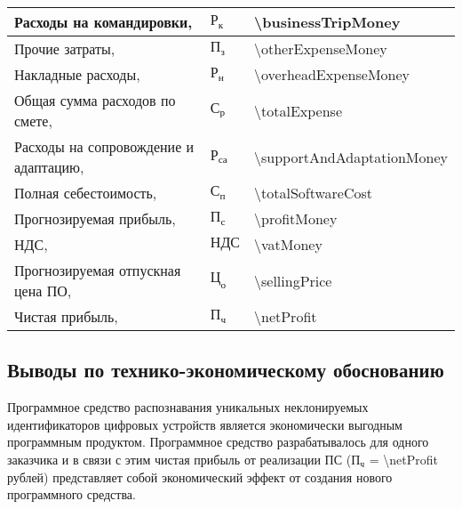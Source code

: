 \begin{longtable}{| >{\raggedright}m{}
                  | >{\centering}m{}
                  | >{\centering\arraybackslash}m{}|}
    Расходы на командировки, \byr{}
    & $ \text{Р}_\text{к} $
    & \num{\businessTripMoney}
    \\ \hline

    Прочие затраты, \byr{}
    & $ \text{П}_\text{з} $
    & \num{\otherExpenseMoney}
    \\ \hline

    Накладные расходы, \byr{}
    & $ \text{Р}_\text{н} $
    & \num{\overheadExpenseMoney}
    \\ \hline

    Общая сумма расходов по смете, \byr{}
    & $ \text{С}_\text{р} $
    & \num{\totalExpense}
    \\ \hline

    Расходы на сопровождение и адаптацию, \byr{}
    & $ \text{Р}_\text{са} $
    & \num{\supportAndAdaptationMoney}
    \\ \hline

    Полная себестоимость, \byr{}
    & $ \text{С}_\text{п} $
    & \num{\totalSoftwareCost}
    \\ \hline

    Прогнозируемая прибыль, \byr{}
    & $ \text{П}_\text{с} $
    & \num{\profitMoney}
    \\ \hline

    НДС, \byr{}
    & $ \text{НДС} $
    & \num{\vatMoney}
    \\ \hline

    Прогнозируемая отпускная цена ПО, \byr{}
    & $ \text{Ц}_\text{о} $
    & \num{\sellingPrice}
    \\ \hline

    Чистая прибыль, \byr{}
    & $ \text{П}_\text{ч} $
    & \num{\netProfit}
    \\ \hline
\end{longtable}



\subsection{Выводы по технико-экономическому обоснованию}

Программное средство распознавания уникальных неклонируемых идентификаторов цифровых устройств является экономически выгодным программным продуктом.
Программное средство разрабатывалось для одного заказчика и в связи с этим чистая прибыль от реализации ПС ($ \text{П}_\text{ч} $ = \num{\netProfit} рублей) представляет собой экономический эффект от создания нового программного средства.


\hfill
\clearpage
